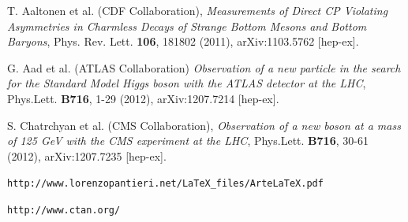 \documentclass[a4paper,10pt]{article}
\begin{document}
\begin{thebibliography}{99}

T. Aaltonen et al. (CDF Collaboration), \textit{Measurements of Direct CP 
Violating Asymmetries in Charmless Decays of Strange Bottom Mesons and Bottom Baryons},
Phys. Rev. Lett. {\bf 106}, 181802 (2011), arXiv:1103.5762 [hep-ex].

G. Aad et al. (ATLAS Collaboration) \textit{Observation of a new particle in the search for the Standard 
Model Higgs boson with the ATLAS detector at the LHC}, Phys.Lett. {\bf B716}, 1-29 (2012), arXiv:1207.7214 [hep-ex].

S. Chatrchyan et al. (CMS Collaboration), \textit{Observation of a new boson at a mass of 125 GeV with the CMS experiment at the LHC},
Phys.Lett. {\bf B716}, 30-61 (2012), arXiv:1207.7235 [hep-ex].

 {\tt http://www.lorenzopantieri.net/LaTeX\_files/ArteLaTeX.pdf}

 {\tt http://www.ctan.org/}

\end{thebibliography}
\end{document}
